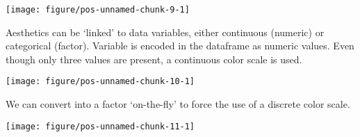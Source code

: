 \documentclass[paper=a4,10pt,div=17,headsepline,BCOR=12mm,twoside,open=right]{scrbook}\usepackage{knitr}
\begin{document}
\begin{knitrout}\footnotesize
{}\color{fgcolor}\begin{kframe}
\begin{alltt}
\hlstd{(}  \hlstd{(}    \hlopt{+} \hlstd{()}
\end{alltt}
\end{kframe}

{\centering \texttt{[image: figure/pos-unnamed-chunk-9-1]} 

}



\end{knitrout}

Aesthetics can be `linked' to data variables, either continuous (numeric) or categorical (factor). Variable  is encoded in the  dataframe as numeric values. Even though only three values are present, a continuous color scale is used.

\begin{knitrout}\footnotesize
{}\color{fgcolor}\begin{kframe}
\begin{alltt}
 \hlstd{(}      \hlopt{+} \hlstd{()}
\end{alltt}
\end{kframe}

{\centering \texttt{[image: figure/pos-unnamed-chunk-10-1]} 

}



\end{knitrout}

We can convert  into a factor `on-the-fly' to force the use of a discrete color scale.

\begin{knitrout}\footnotesize
{}\color{fgcolor}\begin{kframe}
\begin{alltt}
 \hlstd{(}     \hlstd{=}  \hlopt{+} \hlstd{()}
\end{alltt}
\end{kframe}

{\centering \texttt{[image: figure/pos-unnamed-chunk-11-1]} 

}



\end{knitrout}
\end{document}
